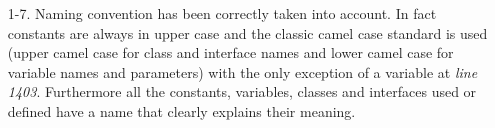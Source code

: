 \begin{itemize}

\item [1-7.] Naming convention has been correctly taken into account. In fact constants are always in upper case and the classic camel case standard is used (upper camel case for class and interface names and lower camel case for variable names and parameters) with the only exception of a variable at \textit{line 1403}. Furthermore all the constants, variables, classes and interfaces used or defined have a name that clearly explains their meaning.

\end{itemize}

\begin{comment}

\begin{itemize}
\item [1.] Names are all meaningful in the context of the code and the given JavaDoc.
\item [2.] All one-character variables are used for temporary "throwaway" variables.
\item [3. - 4.] Classical camel-upper-case standard is followed for both classes and interfaces.
\item [5.] Methods are verbs with the first letter of each addition word capitalize.
\item [6.] Variables have following word in lower case. 
\item [7.] Constants are all in upper case.
\end{itemize}

\end{comment}